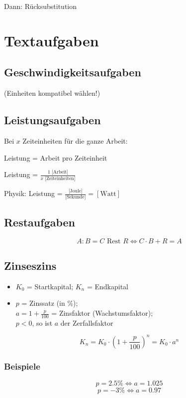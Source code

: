 \begin{multicols}{2}
Dann: Rücksubstitution


\hrulefill
\section*{Textaufgaben}
\subsection*{Geschwindigkeitsaufgaben}
 (Einheiten kompatibel wählen!)

\subsection*{Leistungsaufgaben}
Bei $x$ Zeiteinheiten für die ganze Arbeit:

Leistung = Arbeit pro Zeiteinheit

Leistung = $\frac{1 \textrm{ [Arbeit]}}{x \textrm{ [Zeiteinheiten]}}$

Physik: Leistung = $\frac{\textrm{[Joule]}}{\textrm{[Sekunde]}} = [\textrm{Watt}]$

\subsection*{Restaufgaben}
$$A:B = C \textrm{ Rest } R \Longleftrightarrow{}  C\cdot{}B+R = A$$


\subsection*{Zinseszins}
\begin{itemize}
\item $K_0$ = Startkapital; $K_n$ = Endkapital
\item $p$ = Zinssatz (in \%);\\ $a = 1+\frac{p}{100}$ = Zinsfaktor
(Wachstumsfaktor);\\ $p<0$, so ist $a$ der Zerfallsfaktor
\end{itemize}
$$K_n = K_0 \cdot{} \left( 1+\frac{p}{100} \right)^n = K_0\cdot{}a^n$$

\subsubsection*{Beispiele}
$$p = 2.5\% \Longleftrightarrow{} a = 1.025$$
$$p = -3\% \Longleftrightarrow{}  a = 0.97 $$

\hrulefill

\end{multicols}
